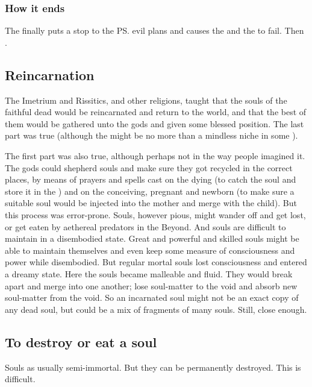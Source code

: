 \subsubsection{How it ends}
The  finally puts a stop to the \ps{\banes}{} evil plans and causes the \sephiroth{} and the \Morbus{} to fail. 
Then . 









\subsection{Reincarnation}
The Imetrium and Rissitics, and other religions, taught that the souls of the faithful dead would be reincarnated and return to the world, and that the best of them would be gathered unto the gods and given some blessed position.
The last part was true (although the  might be no more than a mindless niche in some \matrix).

The first part was also true, although perhaps not in the way people imagined it. 
The gods could shepherd souls and make sure they got recycled in the correct places, by means of prayers and spells cast on the dying (to catch the soul and store it in the \matrix) and on the conceiving, pregnant and newborn (to make sure a suitable soul would be injected into the mother and merge with the child). 
But this process was error-prone. 
Souls, however pious, might wander off and get lost, or get eaten by aethereal predators in the Beyond.
And souls are difficult to maintain in a disembodied state.
Great and powerful and skilled souls might be able to maintain themselves and even keep some measure of consciousness and power while disembodied.
But regular mortal souls lost consciousness and entered a dreamy state.
Here the souls became malleable and fluid.
They would break apart and merge into one another; lose soul-matter to the void and absorb new soul-matter from the void.
So an incarnated soul might not be an exact copy of any dead soul, but could be a mix of fragments of many souls.
Still, close enough.










\subsection{To destroy or eat a soul}
Souls as usually semi-immortal. 
But they can be permanently destroyed. 
This is difficult. 

